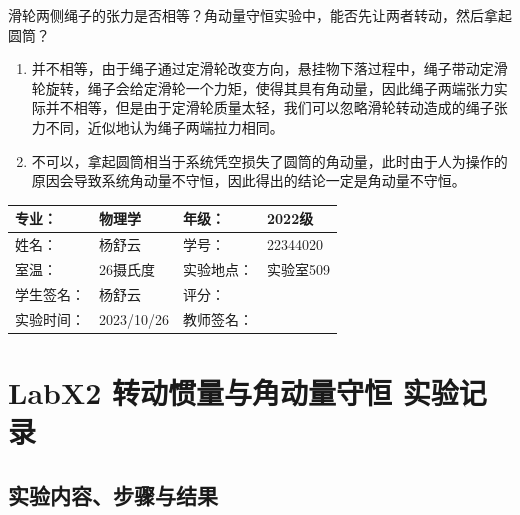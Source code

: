\documentclass[dvipsnames, svgnames,a4paper,11pt]{article}
\begin{document}
	\begin{question}
		滑轮两侧绳子的张力是否相等？角动量守恒实验中，能否先让两者转动，然后拿起圆筒？
	\end{question}
	\begin{enumerate}
		\item 并不相等，由于绳子通过定滑轮改变方向，悬挂物下落过程中，绳子带动定滑轮旋转，绳子会给定滑轮一个力矩，使得其具有角动量，因此绳子两端张力实际并不相等，但是由于定滑轮质量太轻，我们可以忽略滑轮转动造成的绳子张力不同，近似地认为绳子两端拉力相同。
		
		\item 不可以，拿起圆筒相当于系统凭空损失了圆筒的角动量，此时由于人为操作的原因会导致系统角动量不守恒，因此得出的结论一定是角动量不守恒。
	\end{enumerate}
	
	
	
	\clearpage
	\begin{table}
		\renewcommand\arraystretch{1.7}
		\centering
		\begin{tabularx}{\textwidth}{|X|X|X|X|}
			\hline
			专业： & 物理学 & 年级： & 2022级 \\
			\hline
			姓名： & 杨舒云 & 学号： & 22344020\\
			\hline
			室温： & 26摄氏度 & 实验地点： & 实验室509 \\
			\hline
			学生签名：& 杨舒云 & 评分： &\\
			\hline
			实验时间：& 2023/10/26 & 教师签名：&\\
			\hline
		\end{tabularx}
	\end{table}
	
	\section{LabX2 转动惯量与角动量守恒 \quad\heiti 实验记录}
	\subsection{实验内容、步骤与结果}
\end{document}
